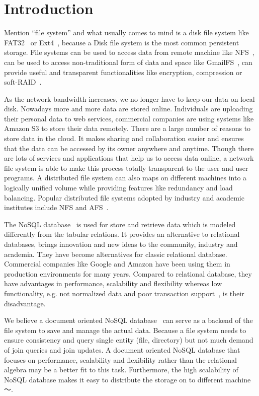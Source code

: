 \chapter{Introduction}
\label{chap:intro}

    Mention ``file system'' and what usually comes to mind is a disk file system like FAT32~\cite{fat_wiki} or Ext4~\cite{ext4}, because a Disk file system is the most common persistent storage. File systems can be used to access data from remote machine like NFS~\cite{nfs}, can be used to access non-traditional form of data and space like GmailFS~\cite{gmailfs, gmailfs2}, can provide useful and transparent functionalities like encryption, compression or soft-RAID~\cite{encrypt, compression}.

    As the network bandwidth increases, we no longer have to keep our data on local disk. Nowadays more and more data are stored online. Individuals are uploading their personal data to web services, commercial companies are using systems like Amazon S3 to store their data remotely. There are a large number of reasons to store data in the cloud. It makes sharing and collaboration easier and ensures that the data can be accessed by its owner anywhere and anytime. Though there are lots of services and applications that help us to access data online, a network file system is able to make this process totally transparent to the user and user programs. A distributed file system can also maps on different machines into a logically unified volume while providing features like redundancy and load balancing. Popular distributed file systems adopted by industry and academic institutes include NFS and AFS~\cite{afs}.

    The NoSQL database~\cite{nosql} is used for store and retrieve data which is modeled differently from the tabular relations. It provides an alternative to relational databases,  brings innovation and new ideas to the community, industry and academia. They have become alternatives for classic relational database. Commercial companies like Google and Amazon have been using them in production environments for many years. Compared to relational database, they have advantages in performance, scalability and flexibility whereas low functionality, e.g. not normalized data and poor transaction support~\cite{transaction}, is their disadvantage.

    We believe a document oriented NoSQL database~\cite{docdb} can serve as a backend of the file system to save and manage the actual data. Because a file system needs to ensure consistency and query single entity (file, directory) but not much demand of join queries and join updates. A document oriented NoSQL database that focuses on performance, scalability and flexibility rather than the relational algebra may be a better fit to this task. Furthermore, the high scalability of NoSQL database makes it easy to distribute the storage on to different machine～\cite{sharding}.


